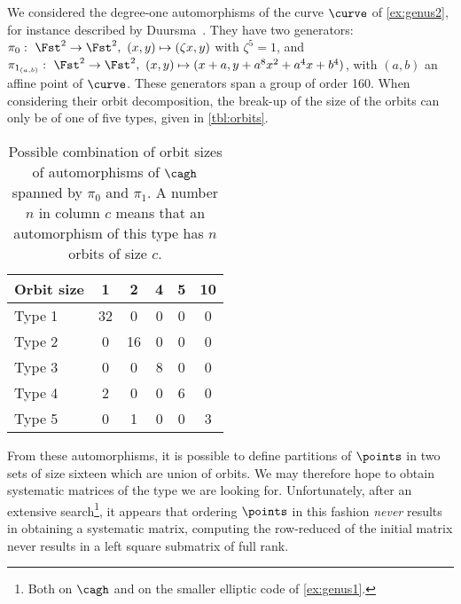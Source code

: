 We considered the degree-one automorphisms of the curve $\curve$ of \autoref{ex:genus2}, for instance described
by Duursma~\cite{duursma}. They have two generators: $\pi_0:~\Fst^2 \rightarrow \Fst^2,~(x, y) \mapsto (\zeta x, y)$ with $\zeta^5 = 1$, and
$\pi_{1_{(a,b)}}:~\Fst^2 \rightarrow \Fst^2,~(x, y) \mapsto (x + a, y + a^8 x^2 + a^4 x + b^4)$, with $(a, b)$ an affine point of $\curve$.
These generators span a group of order 160.
When considering their orbit decomposition, the break-up of the size of the orbits can only be of one of five types, given
in \autoref{tbl:orbits}.

\begin{table}[!h]
\caption{Possible combination of orbit sizes of automorphisms of $\cagh$ spanned by $\pi_0$ and $\pi_1$.
A number $n$ in column $c$ means that an automorphism of this type has $n$ orbits of size $c$.
\label{tbl:orbits}}
\begin{center}
\begin{tabular}{ l  c  c  c  c  c}
\toprule
 Orbit size & 1 & 2 & 4 & 5 & 10 \\
\midrule
Type 1 & 32 & 0 & 0 & 0 & 0\\

Type 2 & 0 & 16 & 0 & 0 & 0\\

Type 3 & 0 & 0 & 8 & 0 & 0\\

Type 4 & 2 & 0 & 0 & 6 & 0\\

Type 5 & 0 & 1 & 0 & 0 & 3\\
\bottomrule
\end{tabular}
\end{center}
\end{table}
\noindent
From these automorphisms, it is possible to define partitions of $\points$ in two sets of size sixteen which are union of orbits. We may therefore
hope to obtain systematic matrices of the type we are looking for. Unfortunately, after an extensive search\footnote{Both on $\cagh$ and
on the smaller elliptic code of \autoref{ex:genus1}.}, it appears that ordering $\points$ in this fashion \emph{never} results in
obtaining a systematic matrix, \ie computing the row-reduced of the initial matrix never results in a left square submatrix of full rank.


